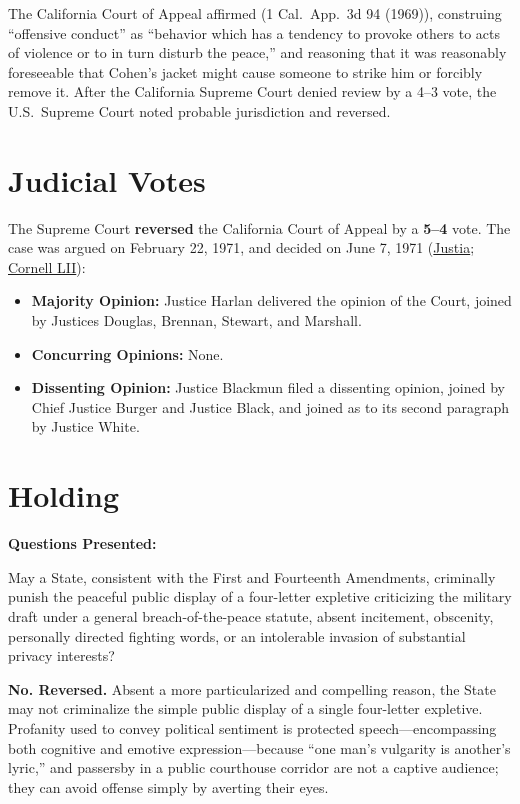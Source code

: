 \documentclass[12pt]{article}
\begin{document}
The California Court of Appeal affirmed (1 Cal.\ App.\ 3d 94 (1969)), construing ``offensive conduct'' as ``behavior which has a tendency to provoke others to acts of violence or to in turn disturb the peace,'' and reasoning that it was reasonably foreseeable that Cohen's jacket might cause someone to strike him or forcibly remove it. After the California Supreme Court denied review by a 4--3 vote, the U.S.\ Supreme Court noted probable jurisdiction and reversed.

\section{Judicial Votes}
The Supreme Court \textbf{reversed} the California Court of Appeal by a \textbf{5--4} vote. The case was argued on February 22, 1971, and decided on June 7, 1971 (\href{https://supreme.justia.com/cases/federal/us/403/15/}{Justia}; \href{https://www.law.cornell.edu/supremecourt/text/403/15}{Cornell LII}):

\begin{itemize}
    \item \textbf{Majority Opinion:} Justice Harlan delivered the opinion of the Court, joined by Justices Douglas, Brennan, Stewart, and Marshall.
    \item \textbf{Concurring Opinions:} None.
    \item \textbf{Dissenting Opinion:} Justice Blackmun filed a dissenting opinion, joined by Chief Justice Burger and Justice Black, and joined as to its second paragraph by Justice White.
\end{itemize}

\section{Holding}
\textbf{Questions Presented:}

May a State, consistent with the First and Fourteenth Amendments, criminally punish the peaceful public display of a four-letter expletive criticizing the military draft under a general breach-of-the-peace statute, absent incitement, obscenity, personally directed fighting words, or an intolerable invasion of substantial privacy interests?

\textbf{No. Reversed.} Absent a more particularized and compelling reason, the State may not criminalize the simple public display of a single four-letter expletive. Profanity used to convey political sentiment is protected speech---encompassing both cognitive and emotive expression---because ``one man's vulgarity is another's lyric,'' and passersby in a public courthouse corridor are not a captive audience; they can avoid offense simply by averting their eyes.
\end{document}
